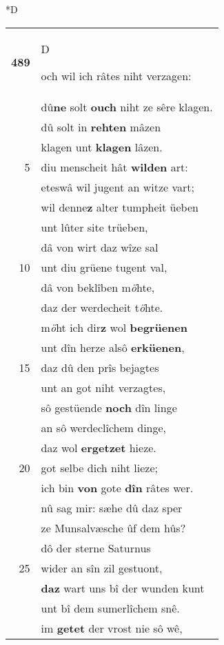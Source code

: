 \documentclass[8pt,a4paper,notitlepage]{article}
\begin{document}
\begin{table}[ht]
\begin{minipage}[t]{0.5\linewidth}
\small
\begin{center}*D
\end{center}
\begin{tabular}{rl}
\textbf{489} & \begin{large}D\end{large}och wil ich râtes niht verzagen:\\ 
 & dû\textbf{ne} solt \textbf{ouch} niht ze sêre klagen.\\ 
 & dû solt in \textbf{rehten} mâzen\\ 
 & klagen unt \textbf{klagen} lâzen.\\ 
5 & diu menscheit hât \textbf{wilden} art:\\ 
 & eteswâ wil jugent an witze vart;\\ 
 & wil denne\textbf{z} alter tumpheit üeben\\ 
 & unt lûter site trüeben,\\ 
 & dâ von wirt daz wîze sal\\ 
10 & unt diu grüene tugent val,\\ 
 & dâ von beklîben m\textit{ö}hte,\\ 
 & daz der werdecheit t\textit{ö}hte.\\ 
 & m\textit{ö}ht ich dir\textbf{z} wol \textbf{begrüenen}\\ 
 & unt dîn herze alsô \textbf{erküenen},\\ 
15 & daz dû den prîs bejagtes\\ 
 & unt an got niht verzagtes,\\ 
 & sô gestüende \textbf{noch} dîn linge\\ 
 & an sô werdeclîchem dinge,\\ 
 & daz wol \textbf{ergetzet} hieze.\\ 
20 & got selbe dich niht lieze;\\ 
 & ich bin \textbf{von} gote \textbf{dîn} râtes wer.\\ 
 & nû sag mir: sæhe dû daz sper\\ 
 & ze Munsalvæsche ûf dem hûs?\\ 
 & dô der sterne Saturnus\\ 
25 & wider an sîn zil gestuont,\\ 
 & \textbf{daz} wart uns bî der wunden kunt\\ 
 & unt bî dem sumerlîchem snê.\\ 
 & im \textbf{getet} der vrost nie sô wê,\\ 

\end{tabular}
\end{minipage}
\end{table}
\end{document}
